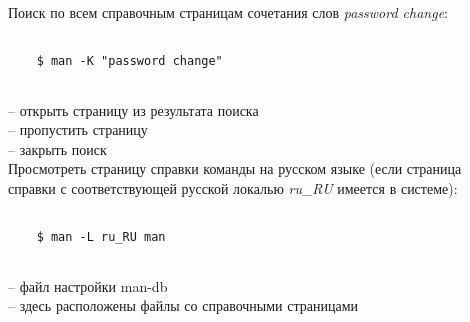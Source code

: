 Поиск по всем справочным страницам сочетания слов \textit{password change}:
\begin{lstlisting}
	
	$ man -K "password change"
	
\end{lstlisting}	
 -- открыть страницу из результата поиска\\
 -- пропустить страницу\\
 -- закрыть поиск\\

Просмотреть страницу справки команды  на русском языке (если страница справки с соответствующей русской локалью \textit{ru\_RU} имеется в системе):
\begin{lstlisting}
	
	$ man -L ru_RU man
	
\end{lstlisting}	

\noindent
{} -- файл настройки man-db\\
 -- здесь расположены файлы со справочными страницами\\
